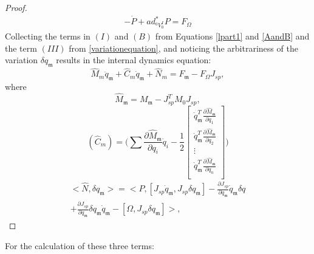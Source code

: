 \documentclass[lettersize,journal]{IEEEtran}
\begin{document}
\begin{proof}[Proof]
\begin{align}
    -\dot{P}+ad^*_{^0V^I_0}P=F_{\Omega}
    \label{euler-poincare_eq}
\end{align}
Collecting the terms in $(I)$ and $(B)$ from Equations \ref{lpart1} and \ref{AandB} and the term $(III)$ from \eqref{variationequation}, and noticing the arbitrariness of the variation $\delta q_\mathfrak{m}$ results in the internal dynamics equation:
\begin{equation}
    {\hat{M}_{m}\ddot{q}_\mathfrak{m}+\hat{C}_{m}\dot{q}_\mathfrak{m}+\hat{N}_{m}=F_\mathfrak{m}-F_{\Omega}J_{sp},}
\end{equation}
where
\begin{equation}
    \hat{M}_\mathfrak{m}=M_\mathfrak{m}-J_{sp}^TM_0J_{sp},
\end{equation}
\begin{equation}
    {(\hat{C}_{m})=\bigg(\sum\frac{\partial \hat{M}_\mathfrak{m}}{\partial{q}_i}\dot{q}_i-\frac{1}{2}\begin{bmatrix}\dot{q}_\mathfrak{m}^T\frac{\partial \hat{M}_\mathfrak{m}}{\partial q_1}\\\dot{q}_\mathfrak{m}^T\frac{\partial \hat{M}_\mathfrak{m}}{\partial q_2}\\ \vdots\\\dot{q}_\mathfrak{m}^T\frac{\partial \hat{M}_\mathfrak{m}}{\partial q_n}\\\end{bmatrix}\bigg)}
\end{equation}
\begin{multline}
    <\hat{N},\delta q_\mathfrak{m}>=<P,[J_{sp}\dot{q}_\mathfrak{m},J_{sp}\delta q_\mathfrak{m}]-\frac{\partial J_{sp}}{\partial q_\mathfrak{m}}\dot{q}_\mathfrak{m}\delta q\\
    +\frac{\partial J_{sp}}{\partial q_\mathfrak{m}}\delta q_\mathfrak{m} \dot{q}_\mathfrak{m}-[\Omega,J_{sp}\delta q_\mathfrak{m}]>,
\end{multline}
\end{proof}
For the calculation of these three terms:
\end{document}
